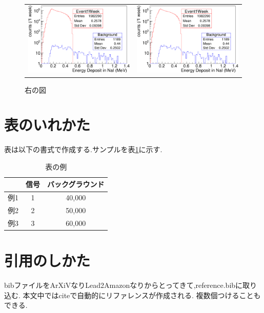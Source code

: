 \begin{figure}[tb]
\begin{tabular}{cc}
\centering

\begin{minipage}{0.5\hsize}
	\includegraphics[width=7cm]{fig/figure.pdf}
	\caption{左の図}
	\label{fig:test3}
\end{minipage}&

\begin{minipage}{0.5\hsize}
	\includegraphics[width=7cm]{fig/figure.pdf}
	\caption{右の図}
	\label{fig:test4}
\end{minipage}

\end{tabular}
\end{figure}


\section{表のいれかた}\label{sec:table}

表は以下の書式で作成する.サンプルを表\ref{tab:test5}に示す.
\begin{table}[tb]
	\centering
	\caption{表の例}
		\label{tab:test5}	
	  \begin{tabular}{lcc} 
		\hline
		 		&信号& バックグラウンド \\ 
		\hline \hline
		例1 	& 1	 & 40,000			\\
		例2 	& 2  & 50,000			\\
		例3 	& 3  & 60,000			\\
		\hline
	  \end{tabular}
\end{table}

\section{引用のしかた}\label{sec:ref}
bibファイルをArXiVなりLead2Amazonなりからとってきて,reference.bibに取り込む.
本文中ではciteで自動的にリファレンスが作成される.\cite{myThesisTest1}
複数個つけることもできる.\cite{myThesisTest2,myWebsite}


